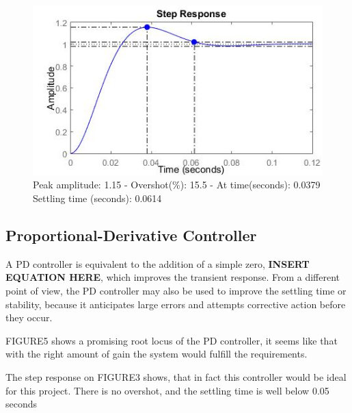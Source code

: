 \begin{figure}[h!]
\centering
\includegraphics[scale=0.7]{Billeder/PIStep.jpg}
\caption{ Peak amplitude: 1.15 - Overshot(\%): 15.5 - At time(seconds): 0.0379
		 Settling time (seconds): 0.0614 }
\label{fig:PIStep}
\end{figure}

\subsection{Proportional-Derivative Controller}

A PD controller is equivalent to the addition of a simple zero, \textbf{INSERT EQUATION HERE}, which improves the transient response. From a different point of view, the PD controller may also be used to improve the settling time or stability, because it anticipates large errors and attempts corrective action before they occur. 

FIGURE5 shows a promising root locus of the PD controller, it seems like that with the right amount of gain the system would fulfill the requirements.

The step response on FIGURE3 shows, that in fact this controller would be ideal for this project. There is no overshot, and the settling time is well below 0.05 seconds

